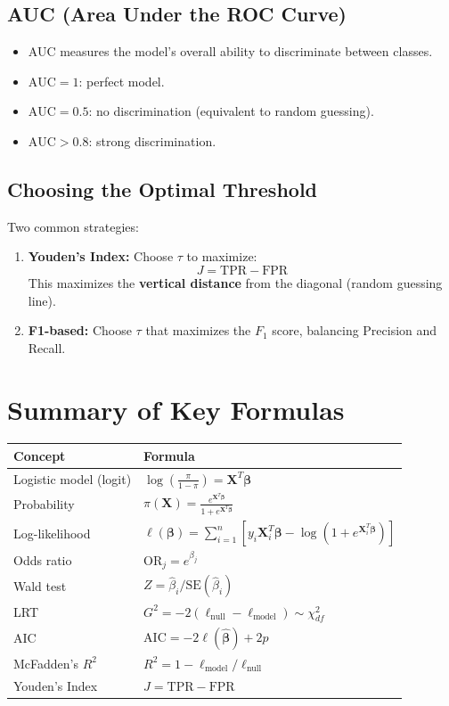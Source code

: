 \documentclass{article}
\begin{document}
\subsection{AUC (Area Under the ROC Curve)}
\begin{itemize}
    \item AUC measures the model's overall ability to discriminate between classes.
    \item $\text{AUC} = 1$: perfect model.
    \item $\text{AUC} = 0.5$: no discrimination (equivalent to random guessing).
    \item $\text{AUC} > 0.8$: strong discrimination.
\end{itemize}

\subsection{Choosing the Optimal Threshold}
Two common strategies:
\begin{enumerate}
    \item \textbf{Youden's Index:} Choose $\tau$ to maximize:
    $$J = \text{TPR} - \text{FPR}$$
    This maximizes the \textbf{vertical distance} from the diagonal (random guessing line).
    \item \textbf{F1-based:} Choose $\tau$ that maximizes the $F_1$ score, balancing Precision and Recall.
\end{enumerate}

\section{Summary of Key Formulas}

\begin{table}[h]
\centering
\small
\begin{tabularx}{\textwidth}{>{\raggedright\arraybackslash}p{}
                            >{\raggedright\arraybackslash}X}
\toprule
\textbf{Concept} & \textbf{Formula} \\
\midrule
Logistic model (logit) & $\log\left(\frac{\pi}{1 - \pi}\right) = \mathbf{X}^T\boldsymbol{\beta}$ \\[6pt]
Probability & $\pi(\mathbf{X}) = \frac{e^{\mathbf{X}^T\boldsymbol{\beta}}}{1 + e^{\mathbf{X}^T\boldsymbol{\beta}}}$ \\[6pt]
Log-likelihood & $\ell(\boldsymbol{\beta}) = \sum_{i=1}^{n} \left[ y_i \mathbf{X}_i^T\boldsymbol{\beta} - \log(1 + e^{\mathbf{X}_i^T\boldsymbol{\beta}}) \right]$ \\[6pt]
Odds ratio & $\text{OR}_j = e^{\beta_j}$ \\[6pt]
Wald test & $Z = \hat{\beta}_i / \text{SE}(\hat{\beta}_i)$ \\[6pt]
LRT & $G^2 = -2(\ell_{\text{null}} - \ell_{\text{model}}) \sim \chi^2_{df}$ \\[6pt]
AIC & $\text{AIC} = -2\ell(\hat{\boldsymbol{\beta}}) + 2p$ \\[6pt]
McFadden's $R^2$ & $R^2 = 1 - \ell_{\text{model}} / \ell_{\text{null}}$ \\[6pt]
Youden's Index & $J = \text{TPR} - \text{FPR}$ \\
\bottomrule
\end{tabularx}
\end{table}
\end{document}
